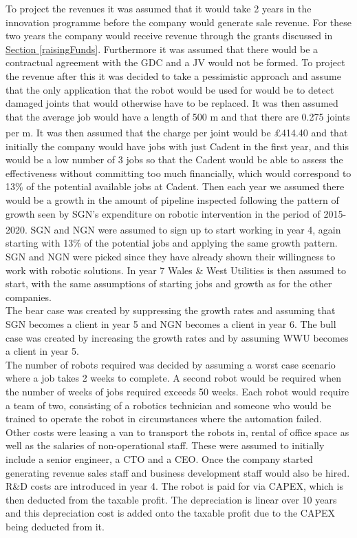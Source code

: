 \documentclass[11pt]{article}		%
\newcommand{\supercite}[1]{\textsuperscript{\cite{#1}}}		%
\newcommand{\sectref}[1]{\hyperref[#1]{Section \ref*{#1}}}     %
\begin{document}
		        To project the revenues it was assumed that it would take 2 years in the innovation programme before the company would generate sale revenue. For these two years the company would receive revenue through the grants discussed in \sectref{raisingFunds}. Furthermore it was assumed that there would be a contractual agreement with the GDC and a JV would not be formed.  
	            To project the revenue after this it was decided to take a pessimistic approach and assume that the only application that the robot would be used for would be to detect damaged joints that would otherwise have to be replaced. It was then assumed that the average job would have a length of 500 m and that there are 0.275 joints per m.\supercite{SGN_Southern} It was then assumed that the charge per joint would be £414.40 and that initially the company would have jobs with just Cadent in the first year, and this would be a low number of 3 jobs so that the Cadent would be able to assess the effectiveness without committing too much financially, which would correspond to 13\% of the potential available jobs at Cadent. Then each year we assumed there would be a growth in the amount of pipeline inspected following the pattern of growth seen by SGN’s expenditure on robotic intervention in the period of 2015-2020.\supercite{SGN_Southern} SGN and NGN were assumed to sign up to start working in year 4, again starting with 13\% of the potential jobs and applying the same growth pattern. SGN and NGN were picked since they have already shown their willingness to work with robotic solutions. In year 7 Wales \& West Utilities is then assumed to start, with the same assumptions of starting jobs and growth as for the other companies.
	            \\
			    The bear case was created by suppressing the growth rates and assuming that SGN becomes a client in year 5 and NGN becomes a client in year 6.
			    The bull case was created by increasing the growth rates and by assuming WWU becomes a client in year 5.
			    \\
			    The number of robots required was decided by assuming a worst case scenario where a job takes 2 weeks to complete. A second robot would be required when the number of weeks of jobs required exceeds 50 weeks. Each robot would require a team of two, consisting of a robotics technician and someone who would be trained to operate the robot in circumstances where the automation failed.
			    \\
			    Other costs were leasing a van to transport the robots in, rental of office space as well as the salaries of non-operational staff. These were assumed to initially include a senior engineer, a CTO and a CEO. Once the company started generating revenue sales staff and business development staff would also be hired. R\&D costs are introduced in year 4. The robot is paid for via CAPEX, which is then deducted from the taxable profit. The depreciation is linear over 10 years and this depreciation cost is added onto the taxable profit due to the CAPEX being deducted from it.
\end{document}
